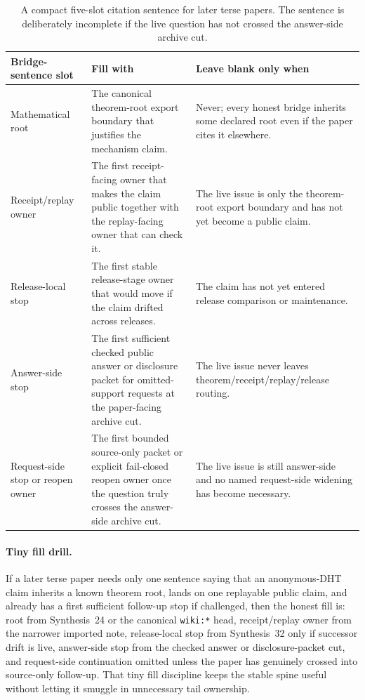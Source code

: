 \documentclass[11pt]{article}
\begin{document}
\begin{table}[t]
\centering
\small
\begin{tabularx}{\linewidth}{@{}L Y Y@{}}
\toprule
Bridge-sentence slot & Fill with & Leave blank only when \\
\midrule
Mathematical root & The canonical theorem-root export boundary that justifies the mechanism claim. & Never; every honest bridge inherits some declared root even if the paper cites it elsewhere. \\
Receipt/replay owner & The first receipt-facing owner that makes the claim public together with the replay-facing owner that can check it. & The live issue is only the theorem-root export boundary and has not yet become a public claim. \\
Release-local stop & The first stable release-stage owner that would move if the claim drifted across releases. & The claim has not yet entered release comparison or maintenance. \\
Answer-side stop & The first sufficient checked public answer or disclosure packet for omitted-support requests at the paper-facing archive cut. & The live issue never leaves theorem/receipt/replay/release routing. \\
Request-side stop or reopen owner & The first bounded source-only packet or explicit fail-closed reopen owner once the question truly crosses the answer-side archive cut. & The live issue is still answer-side and no named request-side widening has become necessary. \\
\bottomrule
\end{tabularx}
\caption{A compact five-slot citation sentence for later terse papers. The sentence is deliberately incomplete if the live question has not crossed the answer-side archive cut.}
\label{tab:five-slot-bridge-sentence}
\end{table}

\paragraph{Tiny fill drill.}
If a later terse paper needs only one sentence saying that an anonymous-DHT claim inherits a known theorem root, lands on one replayable public claim, and already has a first sufficient follow-up stop if challenged, then the honest fill is: root from Synthesis~24 or the canonical \texttt{wiki:*} head, receipt/replay owner from the narrower imported note, release-local stop from Synthesis~32 only if successor drift is live, answer-side stop from the checked answer or disclosure-packet cut, and request-side continuation omitted unless the paper has genuinely crossed into source-only follow-up. That tiny fill discipline keeps the stable spine useful without letting it smuggle in unnecessary tail ownership.\cite{series:mathcrosswalk,series:releasespine,series:answerdisclosurepackets,series:pairedterminalcutoverrules}
\end{document}
